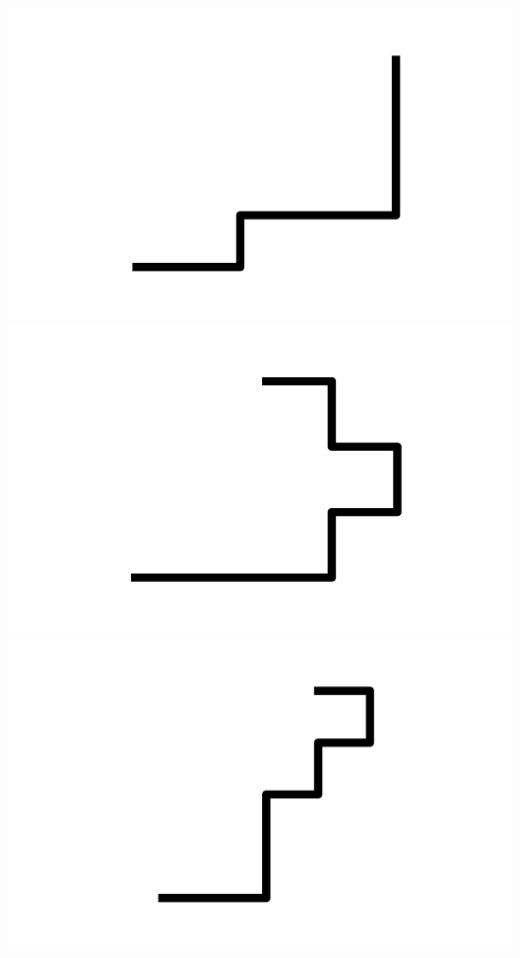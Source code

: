 \documentclass[]{report}
\begin{document}
\includegraphics[scale=.1]{pictures/21/state_cluster_shapes_205.pdf} 
\includegraphics[scale=.1]{pictures/21/state_cluster_shapes_206.pdf} 
\includegraphics[scale=.1]{pictures/21/state_cluster_shapes_207.pdf} 
\end{document}
